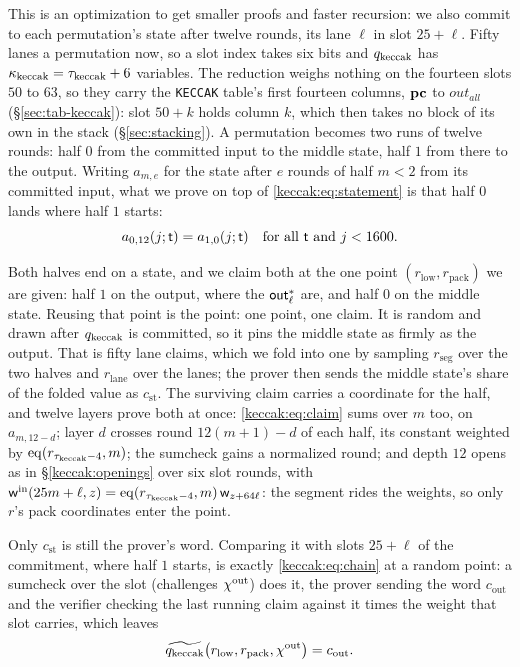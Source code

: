 This is an optimization to get smaller proofs and faster recursion: we also commit to each permutation's state after twelve rounds, its lane $\ell$ in slot $25+\ell$. Fifty lanes a permutation now, so a slot index takes six bits and $q_{\mathrm{keccak}}$ has $\kappa_{\mathrm{keccak}}=\tau_{\mathrm{keccak}}+6$ variables. The reduction weighs nothing on the fourteen slots $50$ to $63$, so they carry the \texttt{KECCAK} table's first fourteen columns, $\mathbf{pc}$ to $\mathit{out}_{\mathit{all}}$ (\S\ref{sec:tab-keccak}): slot $50+k$ holds column $k$, which then takes no block of its own in the stack (\S\ref{sec:stacking}). A permutation becomes two runs of twelve rounds: half $0$ from the committed input to the middle state, half $1$ from there to the output. Writing $a_{m,e}$ for the state after $e$ rounds of half $m<2$ from its committed input, what we prove on top of \eqref{keccak:eq:statement} is that half $0$ lands where half $1$ starts:
\begin{equation}\label{keccak:eq:chain}
a_{0,12}(j;\mathsf{t})=a_{1,0}(j;\mathsf{t})\quad\text{for all }\mathsf{t}\text{ and }j<1600.
\end{equation}

Both halves end on a state, and we claim both at the one point $(r_{\mathrm{low}},r_{\mathrm{pack}})$ we are given: half $1$ on the output, where the $\mathsf{out}^{*}_{\ell}$ are, and half $0$ on the middle state. Reusing that point is the point: one point, one claim. It is random and drawn after $q_{\mathrm{keccak}}$ is committed, so it pins the middle state as firmly as the output. That is fifty lane claims, which we fold into one by sampling $r_{\mathrm{seg}}$ over the two halves and $r_{\mathrm{lane}}$ over the lanes; the prover then sends the middle state's share of the folded value as $c_{\mathrm{st}}$. The surviving claim carries a coordinate for the half, and twelve layers prove both at once: \eqref{keccak:eq:claim} sums over $m$ too, on $a_{m,12-d}$; layer $d$ crosses round $12(m+1)-d$ of each half, its constant weighted by $\operatorname{eq}(r_{\tau_{\mathrm{keccak}}-4},m)$; the sumcheck gains a normalized round; and depth $12$ opens as in \S\ref{keccak:openings} over six slot rounds, with $\mathsf{w}^{\mathrm{in}}(25m+\ell,z)=\operatorname{eq}(r_{\tau_{\mathrm{keccak}}-4},m)\,\mathsf{w}_{z+64\ell}$: the segment rides the weights, so only $r$'s pack coordinates enter the point.

Only $c_{\mathrm{st}}$ is still the prover's word. Comparing it with slots $25+\ell$ of the commitment, where half $1$ starts, is exactly \eqref{keccak:eq:chain} at a random point: a sumcheck over the slot (challenges $\chi^{\mathrm{out}}$) does it, the prover sending the word $c_{\mathrm{out}}$ and the verifier checking the last running claim against it times the weight that slot carries, which leaves
\begin{equation}\label{keccak:eq:out-claim}
\widetilde{q_{\mathrm{keccak}}}\bigl(r_{\mathrm{low}},r_{\mathrm{pack}},\chi^{\mathrm{out}}\bigr)=c_{\mathrm{out}}.
\end{equation}

